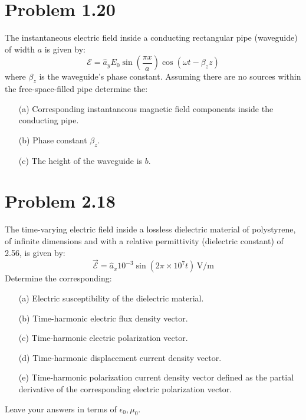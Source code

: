 \documentclass[12pt]{article}
\begin{document}
\section*{Problem 1.20}
The instantaneous electric field inside a conducting rectangular pipe (waveguide) of width \( a \) is given by:
\[
\bm{\mathcal{E}} = \hat{a}_y E_0 \sin\left(\frac{\pi x}{a}\right) \cos(\omega t - \beta_z z)
\]
where \( \beta_z \) is the waveguide's phase constant. Assuming there are no sources within the free-space-filled pipe determine the:
\begin{itemize}
\item[(a)] Corresponding instantaneous magnetic field components inside the conducting pipe.\\
\item[(b)] Phase constant \( \beta_z \).
\item[(c)] The height of the waveguide is \( b \).
\end{itemize}

    
\section*{Problem 2.18}
The time-varying electric field inside a lossless dielectric material of polystyrene, of infinite dimensions and with a relative permittivity (dielectric constant) of 2.56, is given by:
\[
\vec{\mathcal{E}} = \hat{a}_x 10^{-3} \sin(2\pi \times 10^7 t) \, \text{V/m}
\]
Determine the corresponding:
\begin{itemize}
    \item[(a)] Electric susceptibility of the dielectric material.
    \item[(b)] Time-harmonic electric flux density vector.
    \item[(c)] Time-harmonic electric polarization vector.
    \item[(d)] Time-harmonic displacement current density vector.
    \item[(e)] Time-harmonic polarization current density vector defined as the partial derivative of the corresponding electric polarization vector.
\end{itemize}
Leave your answers in terms of \( \epsilon_0, \mu_0 \).

\end{document}
